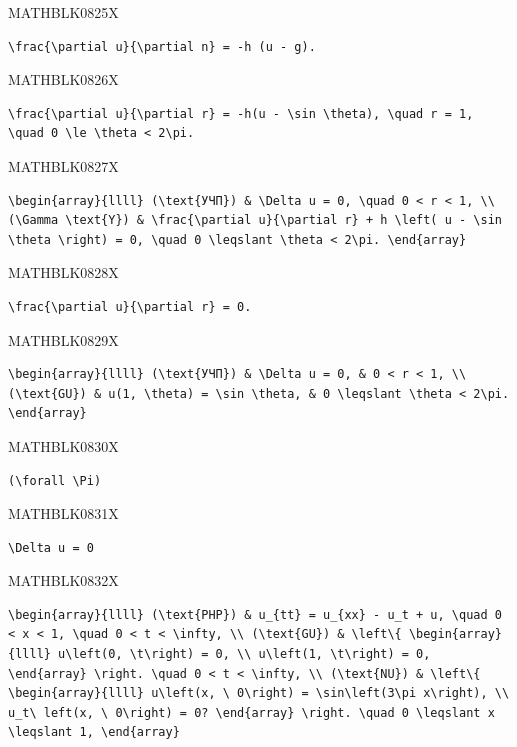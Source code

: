 \documentclass[
  ukrainian,
]{article}
\begin{document}
MATHBLK0825X

\begin{verbatim}
\frac{\partial u}{\partial n} = -h (u - g).
\end{verbatim}

MATHBLK0826X

\begin{verbatim}
\frac{\partial u}{\partial r} = -h(u - \sin \theta), \quad r = 1, \quad 0 \le \theta < 2\pi.
\end{verbatim}

MATHBLK0827X

\begin{verbatim}
\begin{array}{llll} (\text{УЧП}) & \Delta u = 0, \quad 0 < r < 1, \\ (\Gamma \text{Y}) & \frac{\partial u}{\partial r} + h \left( u - \sin \theta \right) = 0, \quad 0 \leqslant \theta < 2\pi. \end{array}
\end{verbatim}

MATHBLK0828X

\begin{verbatim}
\frac{\partial u}{\partial r} = 0.
\end{verbatim}

MATHBLK0829X

\begin{verbatim}
\begin{array}{llll} (\text{УЧП}) & \Delta u = 0, & 0 < r < 1, \\ (\text{GU}) & u(1, \theta) = \sin \theta, & 0 \leqslant \theta < 2\pi. \end{array}
\end{verbatim}

MATHBLK0830X

\begin{verbatim}
(\forall \Pi)
\end{verbatim}

MATHBLK0831X

\begin{verbatim}
\Delta u = 0
\end{verbatim}

MATHBLK0832X

\begin{verbatim}
\begin{array}{llll} (\text{PHP}) & u_{tt} = u_{xx} - u_t + u, \quad 0 < x < 1, \quad 0 < t < \infty, \\ (\text{GU}) & \left\{ \begin{array}{llll} u\left(0, \t\right) = 0, \\ u\left(1, \t\right) = 0, \end{array} \right. \quad 0 < t < \infty, \\ (\text{NU}) & \left\{ \begin{array}{llll} u\left(x, \ 0\right) = \sin\left(3\pi x\right), \\ u_t\ left(x, \ 0\right) = 0? \end{array} \right. \quad 0 \leqslant x \leqslant 1, \end{array}
\end{verbatim}
\end{document}
